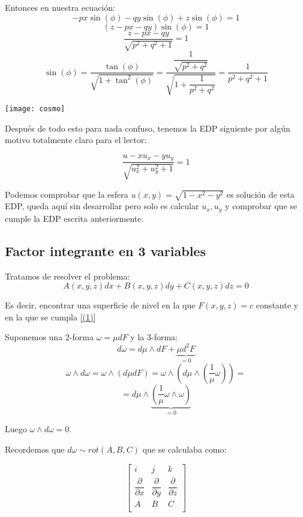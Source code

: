 \documentclass[openany]{book}
\begin{document}
Entonces en nuestra ecuación:
$$ -px \sin(\phi)-qy \sin(\phi) +z \sin(\phi) = 1 $$
$$ (z-px-qy) \sin(\phi) = 1 $$
$$ \dfrac{z-px-qy}{\sqrt{p^2+q^2+1}} = 1 $$
$$ \sin(\phi) = \dfrac{\tan(\phi)}{\sqrt{1+\tan^2(\phi)}} = \dfrac{\dfrac{1}{\sqrt{p^2+q^2}}}{\sqrt{1+\dfrac{1}{p^2+q^2}}} = \dfrac{1}{p^2+q^2+1}$$

\begin{minipage}[l]{0.1\textwidth}
  \texttt{[image: cosmo]}
  \end{minipage}
  \begin{minipage}[l]{0.8\textwidth}
  Después de todo esto para nada confuso, tenemos la EDP siguiente por algún motivo totalmente claro para el lector:
\end{minipage}


$$ \dfrac{u-xu_{x}-yu_{y}}{\sqrt{u_{x}^2+u_{y}^2+1}} =1$$

Podemos comprobar que la esfera $ u(x,y)=\sqrt{1-x^2-y^2} $ es solución de esta EDP, queda aquí sin desarrollar pero solo es calcular $ u_{x},u_{y} $ y comprobar que se cumple la EDP escrita anteriormente.


\subsection{Factor integrante en 3 variables}

Tratamos de resolver el problema:
\begin{equation}
  A(x,y,z)dx + B(x,y,z)dy + C(x,y,z)dz = 0 
  \label{(1)}
\end{equation}

Es decir, encontrar una superficie de nivel en la que $ F(x,y,z)=c $ constante y en la que se cumpla \ref{(1)}

Suponemos una 2-forma $ \omega = \mu dF $ y la 3-forma:
$$ d\omega = d\mu \wedge dF + \underbrace{\mu d^2F}_{=0} $$
$$ \omega \wedge d\omega = \omega \wedge (d\mu dF) = \omega \wedge (d\mu\wedge (\dfrac{1}{\mu}\omega)) = $$
$$ = d\mu \wedge \underbrace{\left( \dfrac{1}{\mu}\omega \wedge \omega \right)}_{=0} $$

Luego $ \omega \wedge d\omega = 0 $.

Recordemos que $ d\omega \sim rot(A,B,C) $ que se calculaba como:

$$ 
\begin{bmatrix} 
i & j & k\\ 
\dfrac{\partial }{\partial x} & \dfrac{\partial }{\partial y} & \dfrac{\partial }{\partial z} \\ 
A & B & C \\ 
\end{bmatrix} 
$$
\end{document}

